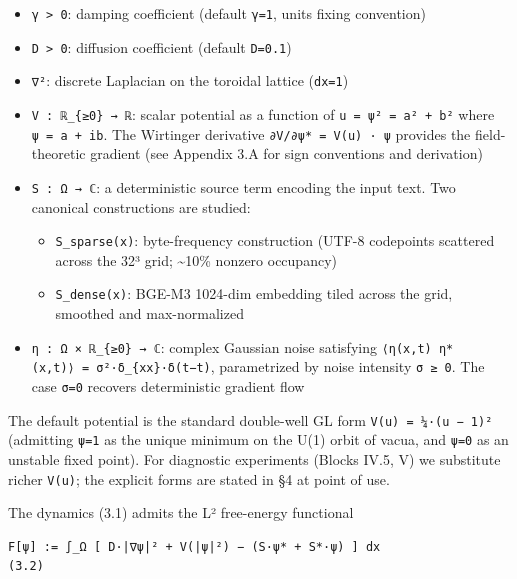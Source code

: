 \documentclass[
]{article}
\providecommand{\tightlist}{%
  \setlength{\itemsep}{0pt}\setlength{\parskip}{0pt}}
\begin{document}
\begin{itemize}
\tightlist
\item
  \texttt{γ\ \textgreater{}\ 0}: damping coefficient (default
  \texttt{γ=1}, units fixing convention)
\item
  \texttt{D\ \textgreater{}\ 0}: diffusion coefficient (default
  \texttt{D=0.1})
\item
  \texttt{∇²}: discrete Laplacian on the toroidal lattice
  (\texttt{dx=1})
\item
  \texttt{V\ :\ ℝ\_\{≥0\}\ →\ ℝ}: scalar potential as a function of
  \texttt{u\ =\ \textbar{}ψ\textbar{}²\ =\ \textbar{}a\textbar{}²\ +\ \textbar{}b\textbar{}²}
  where \texttt{ψ\ =\ a\ +\ ib}. The Wirtinger derivative
  \texttt{∂V/∂ψ*\ =\ V\textquotesingle{}(u)\ ·\ ψ} provides the
  field-theoretic gradient (see Appendix 3.A for sign conventions and
  derivation)
\item
  \texttt{S\ :\ Ω\ →\ ℂ}: a deterministic source term encoding the input
  text. Two canonical constructions are studied:

  \begin{itemize}
  \tightlist
  \item
    \texttt{S\_sparse(x)}: byte-frequency construction (UTF-8 codepoints
    scattered across the 32³ grid; \textasciitilde10\% nonzero
    occupancy)
  \item
    \texttt{S\_dense(x)}: BGE-M3 1024-dim embedding tiled across the
    grid, smoothed and max-normalized
  \end{itemize}
\item
  \texttt{η\ :\ Ω\ ×\ ℝ\_\{≥0\}\ →\ ℂ}: complex Gaussian noise
  satisfying
  \texttt{⟨η(x,t)\ η*(x\textquotesingle{},t\textquotesingle{})⟩\ =\ σ²·δ\_\{xx\textquotesingle{}\}·δ(t−t\textquotesingle{})},
  parametrized by noise intensity \texttt{σ\ ≥\ 0}. The case
  \texttt{σ=0} recovers deterministic gradient flow
\end{itemize}

The default potential is the standard double-well GL form
\texttt{V(u)\ =\ ¼·(u\ −\ 1)²} (admitting
\texttt{\textbar{}ψ\textbar{}=1} as the unique minimum on the U(1) orbit
of vacua, and \texttt{ψ=0} as an unstable fixed point). For diagnostic
experiments (Blocks IV.5, V) we substitute richer \texttt{V(u)}; the
explicit forms are stated in §4 at point of use.

The dynamics (3.1) admits the L² free-energy functional

\begin{verbatim}
F[ψ] := ∫_Ω [ D·|∇ψ|² + V(|ψ|²) − (S·ψ* + S*·ψ) ] dx                       (3.2)
\end{verbatim}
\end{document}
